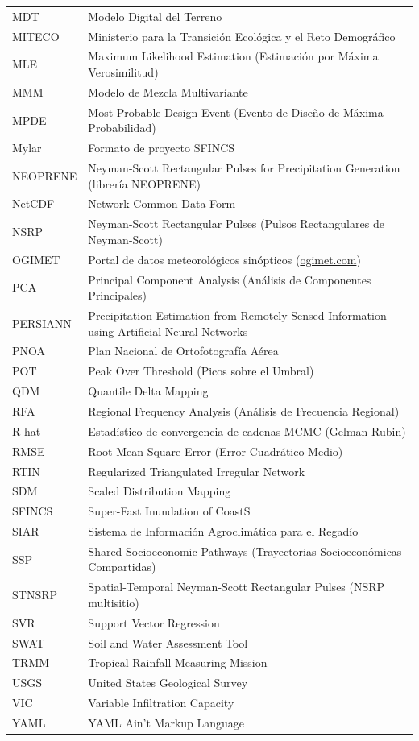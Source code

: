 \begin{longtable}{@{}>{\raggedright\arraybackslash}p{}>{\raggedright\arraybackslash}p{}@{}}
  MDT & Modelo Digital del Terreno \\
  MITECO & Ministerio para la Transición Ecológica y el Reto Demográfico \\
  MLE & Maximum Likelihood Estimation (Estimación por Máxima Verosimilitud) \\
  MMM & Modelo de Mezcla Multivaríante \\
  MPDE & Most Probable Design Event (Evento de Diseño de Máxima Probabilidad) \\
  Mylar & Formato de proyecto SFINCS \\
  NEOPRENE & Neyman-Scott Rectangular Pulses for Precipitation Generation (librería NEOPRENE) \\
  NetCDF & Network Common Data Form \\
  NSRP & Neyman-Scott Rectangular Pulses (Pulsos Rectangulares de Neyman-Scott) \\
  OGIMET & Portal de datos meteorológicos sinópticos (\url{ogimet.com}) \\
  PCA & Principal Component Analysis (Análisis de Componentes Principales) \\
  PERSIANN & Precipitation Estimation from Remotely Sensed Information using Artificial Neural Networks \\
  PNOA & Plan Nacional de Ortofotografía Aérea \\
  POT & Peak Over Threshold (Picos sobre el Umbral) \\
  QDM & Quantile Delta Mapping \\
  RFA & Regional Frequency Analysis (Análisis de Frecuencia Regional) \\
  R-hat & Estadístico de convergencia de cadenas MCMC (Gelman-Rubin) \\
  RMSE & Root Mean Square Error (Error Cuadrático Medio) \\
  RTIN & Regularized Triangulated Irregular Network \\
  SDM & Scaled Distribution Mapping \\
  SFINCS & Super-Fast Inundation of CoastS \\
  SIAR & Sistema de Información Agroclimática para el Regadío \\
  SSP & Shared Socioeconomic Pathways (Trayectorias Socioeconómicas Compartidas) \\
  STNSRP & Spatial-Temporal Neyman-Scott Rectangular Pulses (NSRP multisitio) \\
  SVR & Support Vector Regression \\
  SWAT & Soil and Water Assessment Tool \\
  TRMM & Tropical Rainfall Measuring Mission \\
  USGS & United States Geological Survey \\
  VIC & Variable Infiltration Capacity \\
  YAML & YAML Ain't Markup Language \\
\end{longtable}
